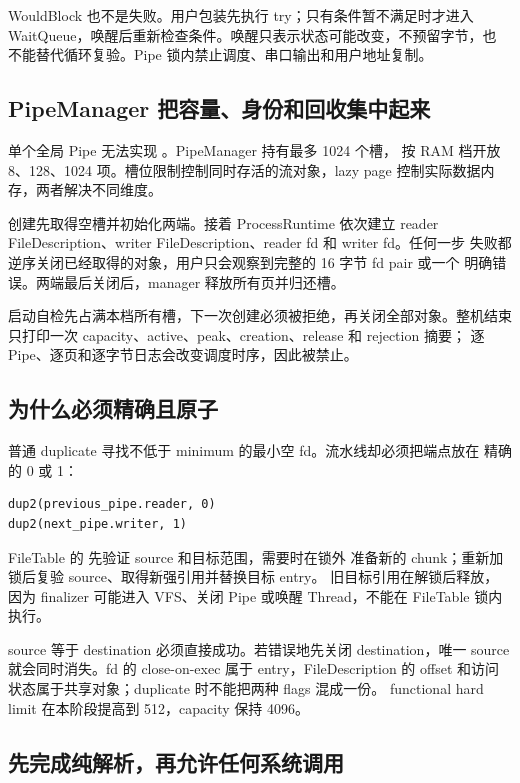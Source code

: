 WouldBlock 也不是失败。用户包装先执行 try；只有条件暂不满足时才进入
WaitQueue，唤醒后重新检查条件。唤醒只表示状态可能改变，不预留字节，也
不能替代循环复验。Pipe 锁内禁止调度、串口输出和用户地址复制。

\subsection{PipeManager 把容量、身份和回收集中起来}

单个全局 Pipe 无法实现 。PipeManager 持有最多 1024 个槽，
按 RAM 档开放 8、128、1024 项。槽位限制控制同时存活的流对象，lazy page
控制实际数据内存，两者解决不同维度。

创建先取得空槽并初始化两端。接着 ProcessRuntime 依次建立 reader
FileDescription、writer FileDescription、reader fd 和 writer fd。任何一步
失败都逆序关闭已经取得的对象，用户只会观察到完整的 16 字节 fd pair 或一个
明确错误。两端最后关闭后，manager 释放所有页并归还槽。

启动自检先占满本档所有槽，下一次创建必须被拒绝，再关闭全部对象。整机结束
只打印一次 capacity、active、peak、creation、release 和 rejection 摘要；
逐 Pipe、逐页和逐字节日志会改变调度时序，因此被禁止。

\subsection{ 为什么必须精确且原子}

普通 duplicate 寻找不低于 minimum 的最小空 fd。流水线却必须把端点放在
精确的 0 或 1：

\begin{verbatim}
dup2(previous_pipe.reader, 0)
dup2(next_pipe.writer, 1)
\end{verbatim}

FileTable 的  先验证 source 和目标范围，需要时在锁外
准备新的 chunk；重新加锁后复验 source、取得新强引用并替换目标 entry。
旧目标引用在解锁后释放，因为 finalizer 可能进入 VFS、关闭 Pipe 或唤醒
Thread，不能在 FileTable 锁内执行。

source 等于 destination 必须直接成功。若错误地先关闭 destination，唯一
source 就会同时消失。fd 的 close-on-exec 属于 entry，FileDescription 的
offset 和访问状态属于共享对象；duplicate 时不能把两种 flags 混成一份。
functional hard limit 在本阶段提高到 512，capacity 保持 4096。

\subsection{先完成纯解析，再允许任何系统调用}

